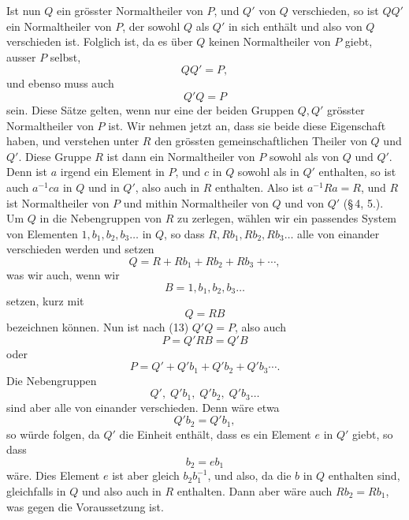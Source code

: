 \documentclass[11pt]{article}
\begin{document}
Ist nun $Q$ ein grösster Normaltheiler von $P$, und $Q'$ von $Q$ verschieden, so ist $QQ'$ ein Normaltheiler von $P$, der sowohl $Q$ als $Q'$ in sich enthält und also von $Q$ verschieden ist. Folglich ist, da es über $Q$ keinen Normaltheiler von $P$ giebt, ausser $P$ selbst,
\begin{equation}
QQ'=P,
\tag{16}
\end{equation}
und ebenso muss auch
\begin{equation}
Q'Q=P
\tag{17}
\end{equation}
sein. Diese Sätze gelten, wenn nur eine der beiden Gruppen $Q,Q'$ grösster Normaltheiler von $P$ ist. Wir nehmen jetzt an, dass sie beide diese Eigenschaft haben, und verstehen unter $R$ den grössten gemeinschaftlichen Theiler von $Q$ und $Q'$. Diese Gruppe $R$ ist dann ein Normaltheiler von $P$ sowohl als von $Q$ und $Q'$. Denn ist $a$ irgend ein Element in $P$, und $c$ in $Q$ sowohl als in $Q'$ enthalten, so ist auch $a^{-1}ca$ in $Q$ und in $Q'$, also auch in $R$ enthalten. Also ist $a^{-1}Ra=R$, und $R$ ist Normaltheiler von $P$ und mithin Normaltheiler von $Q$ und von $Q'$ (\S\,4, 5.). Um $Q$ in die Nebengruppen von $R$ zu zerlegen, wählen wir ein passendes System von Elementen $1,b_1,b_2,b_3\ldots$ in $Q$, so dass $R,Rb_1,Rb_2,Rb_3\ldots$ alle von einander verschieden werden und setzen
\[
Q=R+Rb_1+Rb_2+Rb_3+\cdots,
\]
was wir auch, wenn wir
\begin{equation}
B=1,b_1,b_2,b_3\ldots
\tag{18}
\end{equation}
setzen, kurz mit
\begin{equation}
Q=RB
\tag{19}
\end{equation}
bezeichnen können. Nun ist nach (13) $Q'Q=P$, also auch
\begin{equation}
P=Q'RB=Q'B
\tag{20}
\end{equation}
oder
\[
P=Q'+Q'b_1+Q'b_2+Q'b_3\cdots.
\]
Die Nebengruppen
\begin{equation}
Q',\;Q'b_1,\;Q'b_2,\;Q'b_3\ldots
\tag{21}
\end{equation}
sind aber alle von einander verschieden. Denn wäre etwa
\[
Q'b_2=Q'b_1,
\]
so würde folgen, da $Q'$ die Einheit enthält, dass es ein Element $e$ in $Q'$ giebt, so dass
\[
b_2=eb_1
\]
wäre. Dies Element $e$ ist aber gleich $b_2b_1^{-1}$, und also, da die $b$ in $Q$ enthalten sind, gleichfalls in $Q$ und also auch in $R$ enthalten. Dann aber wäre auch $Rb_2=Rb_1$, was gegen die Voraussetzung ist.
\end{document}
